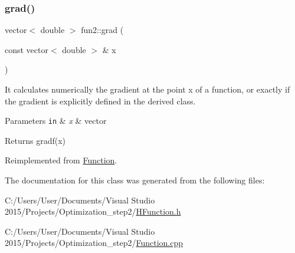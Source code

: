 \mbox{\label{classfun2_ae8465662c95bd065f993853609277e9b}} 
\subsubsection{\texorpdfstring{grad()}{grad()}}
{\footnotesize\ttfamily vector$<$ double $>$ fun2\+::grad (\begin{DoxyParamCaption}\item[{const vector$<$ double $>$ \&}]{x }\end{DoxyParamCaption})\hspace{0.3cm}{\ttfamily [virtual]}}



It calculates numerically the gradient at the point x of a function, or exactly if the gradient is explicitly defined in the derived class. 


\begin{DoxyParams}[1]{Parameters}
\mbox{\tt in}  & {\em x} & vector \\
\hline
\end{DoxyParams}
\begin{DoxyReturn}{Returns}
gradf(x) 
\end{DoxyReturn}


Reimplemented from \hyperlink{class_function_a1396da5e1ee7418c76f14731128c08b4}{Function}.



The documentation for this class was generated from the following files\+:\begin{DoxyCompactItemize}
\item 
C\+:/\+Users/\+User/\+Documents/\+Visual Studio 2015/\+Projects/\+Optimization\+\_\+step2/\hyperlink{_h_function_8h}{H\+Function.\+h}\item 
C\+:/\+Users/\+User/\+Documents/\+Visual Studio 2015/\+Projects/\+Optimization\+\_\+step2/\hyperlink{_function_8cpp}{Function.\+cpp}\end{DoxyCompactItemize}
